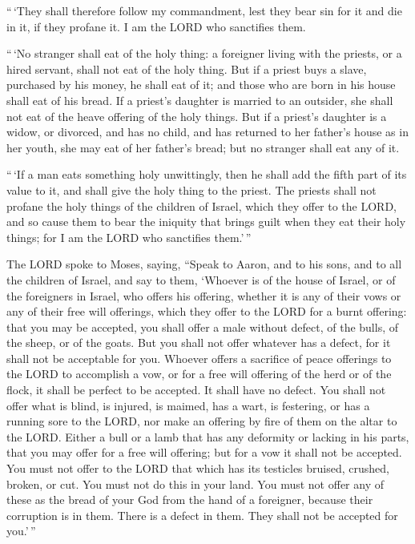  ``\,`They shall therefore follow my commandment, lest they
bear sin for it and die in it, if they profane it. I am the LORD who
sanctifies them.

 ``\,`No stranger shall eat of the holy thing: a foreigner
living with the priests, or a hired servant, shall not eat of the holy
thing.  But if a priest buys a slave, purchased by his
money, he shall eat of it; and those who are born in his house shall eat
of his bread.  If a priest's daughter is married to an
outsider, she shall not eat of the heave offering of the holy things.
 But if a priest's daughter is a widow, or divorced, and
has no child, and has returned to her father's house as in her youth,
she may eat of her father's bread; but no stranger shall eat any of it.

 ``\,`If a man eats something holy unwittingly, then he
shall add the fifth part of its value to it, and shall give the holy
thing to the priest.  The priests shall not profane the
holy things of the children of Israel, which they offer to the LORD,
 and so cause them to bear the iniquity that brings guilt
when they eat their holy things; for I am the LORD who sanctifies
them.'\,''

 The LORD spoke to Moses, saying,  ``Speak to
Aaron, and to his sons, and to all the children of Israel, and say to
them, `Whoever is of the house of Israel, or of the foreigners in
Israel, who offers his offering, whether it is any of their vows or any
of their free will offerings, which they offer to the LORD for a burnt
offering:  that you may be accepted, you shall offer a male
without defect, of the bulls, of the sheep, or of the goats.
 But you shall not offer whatever has a defect, for it
shall not be acceptable for you.  Whoever offers a
sacrifice of peace offerings to the LORD to accomplish a vow, or for a
free will offering of the herd or of the flock, it shall be perfect to
be accepted. It shall have no defect.  You shall not offer
what is blind, is injured, is maimed, has a wart, is festering, or has a
running sore to the LORD, nor make an offering by fire of them on the
altar to the LORD.  Either a bull or a lamb that has any
deformity or lacking in his parts, that you may offer for a free will
offering; but for a vow it shall not be accepted.  You must
not offer to the LORD that which has its testicles bruised, crushed,
broken, or cut. You must not do this in your land.  You
must not offer any of these as the bread of your God from the hand of a
foreigner, because their corruption is in them. There is a defect in
them. They shall not be accepted for you.'\,''

